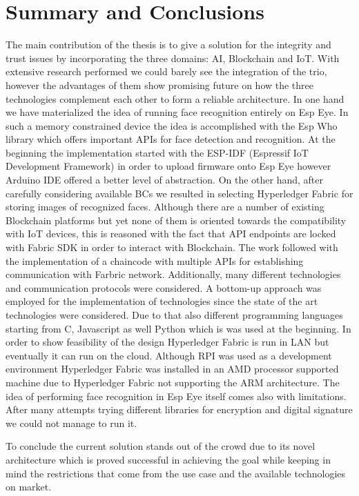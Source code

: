 \chapter{Summary and Conclusions}



The main contribution of the thesis is to give a solution for the integrity and trust issues by incorporating the three domains: AI, Blockchain and IoT. With extensive research performed we could barely see the integration of the trio, however the advantages of them show promising future on how the three technologies complement each other to form a reliable architecture. In one hand we have materialized the idea of running face recognition entirely on Esp Eye. In such a memory constrained device the idea is accomplished with the Esp Who library which offers important APIs for face detection and recognition. At the beginning the implementation started with the ESP-IDF (Espressif IoT Development Framework) in order to upload firmware onto Esp Eye however Arduino IDE offered a better level of abstraction. On the other hand, after carefully considering available BCs we resulted in selecting Hyperledger Fabric for storing images of recognized faces.
Although there are a number of existing Blockchain platforms but yet none of them is oriented towards the compatibility with IoT devices, this is reasoned with the fact that API endpoints are locked with Fabric SDK in order to interact with Blockchain.  The work followed with the implementation of a chaincode with multiple APIs for establishing communication with Farbric network. 
Additionally, many different technologies and communication protocols were considered. A bottom-up approach was employed for the implementation of technologies since the state of the art technologies were considered. Due to that also different programming languages starting from C, Javascript as well Python which is was used at the beginning. In order to show feasibility of the design Hyperledger Fabric is run in LAN but eventually it can run on the cloud. Although RPI was used as a development environment Hyperledger Fabric was installed in an AMD processor supported machine due to Hyperledger Fabric not supporting the ARM architecture. 
The idea of performing face recognition in Esp Eye itself comes also with limitations. After many attempts trying different libraries for encryption and digital signature we could not manage to run it.  

To conclude the current solution stands out of the crowd due to its novel architecture which is proved successful in achieving the goal while keeping in mind the restrictions that come from the use case and the available technologies on market. 


